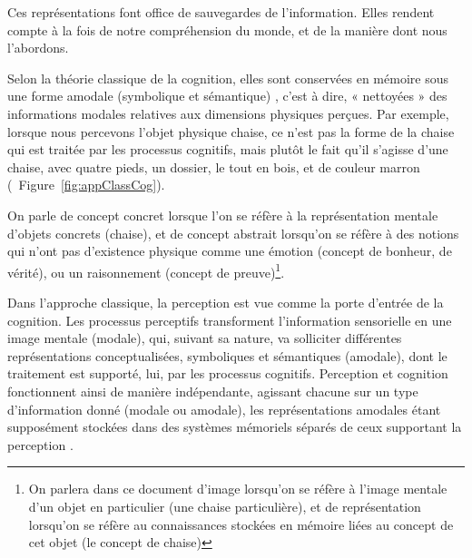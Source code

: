 Ces représentations font office de sauvegardes de l'information. Elles rendent compte à la fois de notre compréhension du monde, et de la manière dont nous l'abordons. 

Selon la théorie classique de la cognition, elles sont conservées en mémoire sous une forme amodale (symbolique et sémantique) \citep[p. 357]{mcadams1994penser}, c'est à dire, « nettoyées » des informations modales relatives aux dimensions physiques perçues. Par exemple, lorsque nous percevons l'objet physique chaise, ce n'est pas la forme de la chaise qui est traitée par les processus cognitifs, mais plutôt le fait qu'il s'agisse d'une chaise, avec quatre pieds, un dossier, le tout en bois, et de couleur marron (\cf~Figure~\ref{fig:appClassCog}).
 
On parle de concept concret lorsque l'on se réfère à la représentation mentale d'objets concrets (chaise), et de concept abstrait lorsqu'on se réfère à des notions qui n'ont pas d'existence physique comme une émotion (concept de bonheur, de vérité), ou un raisonnement (concept de preuve)\footnote{On parlera dans ce document d'image lorsqu'on se réfère à l'image mentale d'un objet en particulier (une chaise particulière), et de représentation lorsqu'on se réfère au connaissances stockées en mémoire liées au concept de cet objet (le concept de chaise)}.
 
Dans l'approche classique, la perception est vue comme la porte d'entrée de la cognition. Les processus perceptifs transforment l'information sensorielle en une image mentale (modale), qui, suivant sa nature, va solliciter différentes représentations conceptualisées, symboliques et sémantiques (amodale), dont le traitement est supporté, lui, par les processus cognitifs. Perception et cognition fonctionnent ainsi de manière indépendante, agissant chacune sur un type d'information donné (modale ou amodale), les représentations amodales étant supposément stockées dans des systèmes mémoriels séparés de ceux supportant la perception \citep{barsalou2008grounded}.

